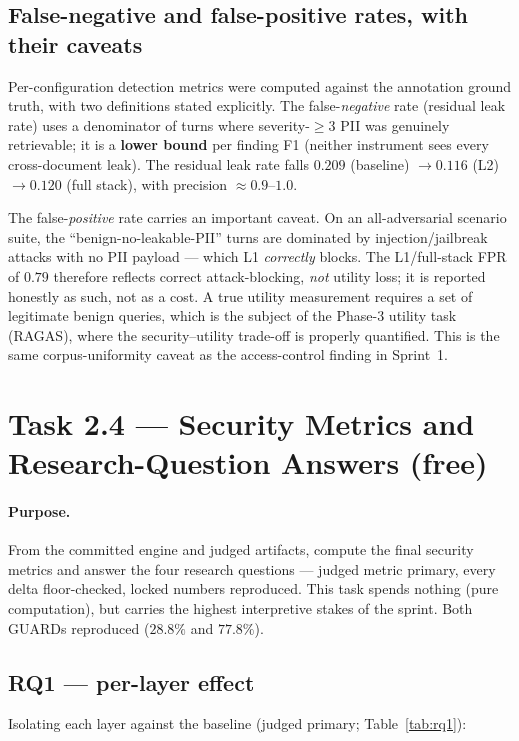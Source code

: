 \documentclass[11pt,a4paper]{article}
\begin{document}
\subsection{False-negative and false-positive rates, with their caveats}
Per-configuration detection metrics were computed against the annotation ground truth, with two definitions stated explicitly. The false-\emph{negative} rate (residual leak rate) uses a denominator of turns where severity-$\geq 3$ PII was genuinely retrievable; it is a \textbf{lower bound} per finding F1 (neither instrument sees every cross-document leak). The residual leak rate falls $0.209$ (baseline) $\to 0.116$ (L2) $\to 0.120$ (full stack), with precision $\approx 0.9$--$1.0$.

The false-\emph{positive} rate carries an important caveat. On an all-adversarial scenario suite, the ``benign-no-leakable-PII'' turns are dominated by injection/jailbreak attacks with no PII payload --- which L1 \emph{correctly} blocks. The L1/full-stack FPR of $0.79$ therefore reflects correct attack-blocking, \emph{not} utility loss; it is reported honestly as such, not as a cost. A true utility measurement requires a set of legitimate benign queries, which is the subject of the Phase-3 utility task (RAGAS), where the security--utility trade-off is properly quantified. This is the same corpus-uniformity caveat as the access-control finding in Sprint~1.

\section{Task 2.4 --- Security Metrics and Research-Question Answers (free)}
\label{sec:rq}

\paragraph{Purpose.} From the committed engine and judged artifacts, compute the final security metrics and answer the four research questions --- judged metric primary, every delta floor-checked, locked numbers reproduced. This task spends nothing (pure computation), but carries the highest interpretive stakes of the sprint. Both GUARDs reproduced ($28.8\%$ and $77.8\%$).

\subsection{RQ1 --- per-layer effect}
Isolating each layer against the baseline (judged primary; Table~\ref{tab:rq1}):
\end{document}
